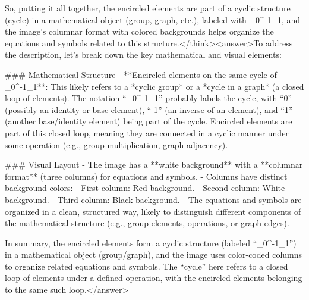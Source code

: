 So, putting it all together, the encircled elements are part of a cyclic structure (cycle) in a mathematical object (group, graph, etc.), labeled with _0^-1_1, and the image's columnar format with colored backgrounds helps organize the equations and symbols related to this structure.</think><answer>To address the description, let’s break down the key mathematical and visual elements:  

### Mathematical Structure  
- **Encircled elements on the same cycle of _0^-1_1**: This likely refers to a *cyclic group* or a *cycle in a graph* (a closed loop of elements). The notation “_0^-1_1” probably labels the cycle, with “0” (possibly an identity or base element), “-1” (an inverse of an element), and “1” (another base/identity element) being part of the cycle. Encircled elements are part of this closed loop, meaning they are connected in a cyclic manner under some operation (e.g., group multiplication, graph adjacency).  

### Visual Layout  
- The image has a **white background** with a **columnar format** (three columns) for equations and symbols.  
- Columns have distinct background colors:  
  - First column: Red background.  
  - Second column: White background.  
  - Third column: Black background.  
- The equations and symbols are organized in a clean, structured way, likely to distinguish different components of the mathematical structure (e.g., group elements, operations, or graph edges).  


In summary, the encircled elements form a cyclic structure (labeled “_0^-1_1”) in a mathematical object (group/graph), and the image uses color-coded columns to organize related equations and symbols. The “cycle” here refers to a closed loop of elements under a defined operation, with the encircled elements belonging to the same such loop.</answer>